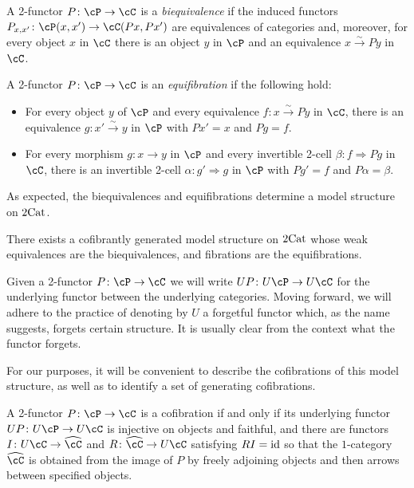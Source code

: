 \documentclass[11pt, dvipsnames]{amsart}
\begin{document}
		\begin{defn}
			A 2-functor $P\colon\cP\to\cC$ is a \emph{biequivalence} if the induced functors \linebreak
            $P_{x,x'}\colon\cP(x,x')\to\cC(Px,Px')$ are equivalences of categories and, moreover, for every object $x$ in $\cC$ there is an object $y$ in $\cP$ and an equivalence $x\xrightarrow{\sim} Py$ in $\cC$.
		\end{defn}

		\begin{defn}\label{defn:lackfib}
			A 2-functor $P\colon\cP\to\cC$ is an \emph{equifibration} if the following hold:
			\begin{itemize}
				\item \label{defn:lackfib.1}
				For every object $y$ of $\cP$ and every equivalence $f\colon x\xrightarrow{\sim} Py$ in $\cC$, there is an equivalence $g\colon x'\xrightarrow{\sim} y$ in $\cP$ with $Px' = x$ and $Pg = f$.
				\item \label{defn:lackfib.2}
				For every morphism $g\colon x\to y$ in $\cP$ and every invertible 2-cell $\beta\colon f\Rightarrow Pg$ in $\cC$, there is an invertible 2-cell $\alpha\colon g'\Rightarrow g$ in $\cP$ with $Pg' = f$ and $P\alpha = \beta$.
			\end{itemize}
		\end{defn}

As expected, the biequivalences and equifibrations determine a model structure on $2\mathrm{Cat}$.
        
		\begin{thm} \label{cofibrant-model:2cat}
			There exists a cofibrantly generated model structure on $2\mathrm{Cat}$ whose weak equivalences are the biequivalences, and fibrations are the equifibrations.
		\end{thm}

Given a 2-functor $P\colon\cP \to \cC$ we will write $UP\colon U\cP \to U\cC$ for the underlying functor between the underlying categories. Moving forward, we will adhere to the practice of denoting by $U$ a forgetful functor which, as the name suggests, forgets certain structure. It is usually clear from the context what the functor forgets. 

For our purposes, it will be convenient to describe the cofibrations of this model structure, as well as to identify a set of generating cofibrations. 

		\begin{prop}\label{prop:cofibrationsLack}
			A 2-functor $P\colon\cP\to\cC$ is a cofibration if and only if its underlying functor $UP\colon U\cP\to U\cC$ is injective on objects and faithful, and there are functors $I\colon U\cC \to \widehat{\cC}$ and $R\colon\widehat{\cC}\to U\cC$ satisfying $RI = \mathrm{id}$ so that the $1$-category $\widehat{\cC}$ is obtained from the image of $P$ by freely adjoining objects and then arrows between specified objects.
		\end{prop}
\end{document}
